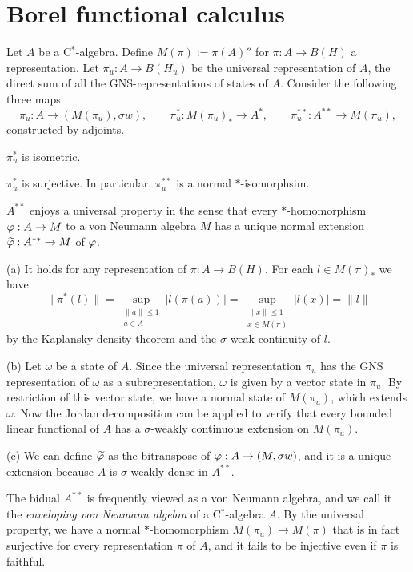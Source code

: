 \documentclass{../../large}
\begin{document}
\begin{prb}
\end{prb}







\section{Borel functional calculus}

\begin{prb}
Let $A$ be a C$^*$-algebra.
Define $M(\pi):=\pi(A)''$ for $\pi:A\to B(H)$ a representation.
Let $\pi_u:A\to B(H_u)$ be the universal representation of $A$, the direct sum of all the GNS-representations of states of $A$.
Consider the following three maps
\[\pi_u:A\to(M(\pi_u),\sigma w),\qquad\pi_u^*:M(\pi_u)_*\to A^*,\qquad\pi_u^{**}:A^{**}\to M(\pi_u),\]
constructed by adjoints.
\begin{parts}
\item $\pi_u^*$ is isometric.
\item $\pi_u^*$ is surjective.
In particular, $\pi_u^{**}$ is a normal $*$-isomorphsim.
\item $A^{**}$ enjoys a universal property in the sense that every $*$-homomorphism $\varphi:A\to M$ to a von Neumann algebra $M$ has a unique normal extension $\widetilde{\varphi}:A^{**}\to M$ of $\varphi$.
\end{parts}
\end{prb}
\begin{pf}
(a)
It holds for any representation of $\pi:A\to B(H)$.
For each $l\in M(\pi)_*$ we have
\[\|\pi^*(l)\|=\sup_{\substack{\|a\|\le1\\a\in A}}|l(\pi(a))|=\sup_{\substack{\|x\|\le1\\x\in M(\pi)}}|l(x)|=\|l\|\] by the Kaplansky density theorem and the $\sigma$-weak continuity of $l$.

(b)
Let $\omega$ be a state of $A$.
Since the universal representation $\pi_u$ has the GNS representation of $\omega$ as a subrepresentation, $\omega$ is given by a vector state in $\pi_u$.
By restriction of this vector state, we have a normal state of $M(\pi_u)$, which extends $\omega$.
Now the Jordan decomposition can be applied to verify that every bounded linear functional of $A$ has a $\sigma$-weakly continuous extension on $M(\pi_u)$.

(c)
We can define $\widetilde{\varphi}$ as the bitranspose of $\varphi:A\to(M,\sigma w)$, and it is a unique extension because $A$ is $\sigma$-weakly dense in $A^{**}$.
\end{pf}
\begin{rmk}
The bidual $A^{**}$ is frequently viewed as a von Neumann algebra, and we call it the \emph{enveloping von Neumann algebra} of a C$^*$-algebra $A$.
By the universal property, we have a normal $*$-homomorphism $M(\pi_u)\to M(\pi)$ that is in fact surjective for every representation $\pi$ of $A$, and it fails to be injective even if $\pi$ is faithful.
\end{rmk}
\end{document}
